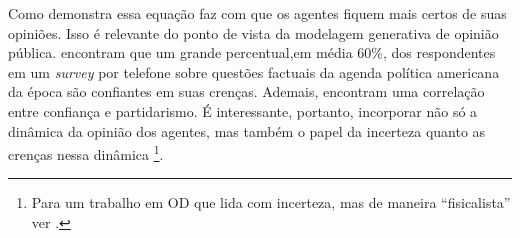      Como demonstra  essa equação faz com que
      os agentes fiquem mais certos de suas opiniões. Isso é relevante do ponto
      de vista da modelagem generativa de opinião pública.
       encontram que um grande
      percentual,em média \( 60 \%\), dos respondentes em um
      \textit{survey} por telefone sobre questões factuais da agenda política
      americana da época são confiantes em suas crenças. Ademais, encontram uma
      correlação entre confiança e partidarismo. É interessante, portanto,
      incorporar não só a dinâmica da opinião dos agentes, mas também o papel da
      incerteza quanto as crenças nessa dinâmica \footnote{Para um trabalho em
        OD que lida com incerteza, mas de maneira ``fisicalista'' ver
        .}.


